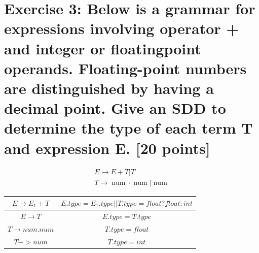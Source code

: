 \documentclass{article}
\begin{document}
    \section{Exercise 3: Below is a grammar for expressions involving operator + and integer or floatingpoint operands. Floating-point numbers are distinguished by having a decimal point. Give
    an SDD to determine the type of each term T and expression E. [20 points]}
    $$
        \begin{aligned} E \rightarrow E+T | T \\ T \rightarrow \operatorname{num} \cdot \operatorname{num} | \operatorname{num} \end{aligned}
    $$
    \begin{table}[!htbp]
        \centering
        \label{tab:aStrangeTable}
        \begin{tabular}{|c|c|}
            \hline
            $E\rightarrow E_1+T$ & $E.type = E_1.type||T.type=float?float:int$\\
            \hline
            $E\rightarrow T$ & $E.type = T.type$ \\
            \hline
            $T\rightarrow num.num$ & $T.type = float$\\
            \hline
            $T->num$ & $T.type = int$\\
            \hline
            
        \end{tabular}
    \end{table}
    
\end{document}
